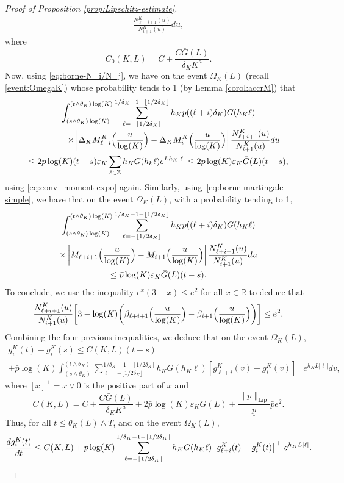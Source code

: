 \documentclass[10pt]{amsart}
\theoremstyle{plain}
\theoremstyle{remark}
\newcommand\Z{\mathbb{Z}}
\begin{document}
\begin{proof}[Proof of Proposition \ref{prop:Lipschitz-estimate}]
{\begin{align*}
\frac{N^K_{\ell+i+1}(u)}{N^K_{i+1}(u)}du,
\end{align*}
where \[C_0(K,L) = C+\frac{C\bar G(L)}{\delta_K K^a}.\] Now, using \eqref{eq:borne-N_i/N_j}, we have on the event $\Omega_K(L)$ (recall \eqref{event:OmegaK}) whose probability tends to 1 (by Lemma \ref{corol:accrM}) that
\begin{multline*}
\int_{(s\wedge\theta_K)\log(K)}^{(t\wedge\theta_K)\log(K)} \sum_{\ell=-\lfloor 1/2\delta_K\rfloor}^{1/\delta_K-1-\lfloor 1/2\delta_K\rfloor}
h_{K} p((\ell+i)\delta_K)G(h_{K}\ell)\\[-3pt]
\shoveright{\times\left|\Delta_KM^K_{\ell+i}\Bigl(\frac{u}{\log(K)}\Bigr)-\Delta_KM^K_{i}\Bigl(\frac{u}{\log(K)}\Bigr)\right|
\frac{N^K_{\ell+i+1}(u)}{N^K_{i+1}(u)}du} \\
\leq 2\bar p \log(K) (t-s)\varepsilon_K\sum_{\ell\in\Z} h_K G(h_k\ell)e^{L h_K|\ell|}\leq 2\bar{p}\log(K) \varepsilon_K \bar G(L)(t-s),
\end{multline*}
using \eqref{eq:conv_moment-expo} again.
Similarly, using~\eqref{eq:borne-martingale-simple}, we have that on the event $\Omega_K(L)$, with a probability tending to 1,
\begin{multline*}
\int_{(s\wedge\theta_K)\log(K)}^{(t\wedge\theta_K)\log(K)} \sum_{\ell=-\lfloor 1/2\delta_K\rfloor}^{1/\delta_K-1-\lfloor 1/2\delta_K\rfloor}
h_{K} p((\ell+i)\delta_K)G(h_{K}\ell)\\
\times \left|M_{\ell+i+1}\Bigl(\frac{u}{\log(K)}\Bigr)-M_{i+1}\Bigl(\frac{u}{\log(K)}\Bigr)\right|
\frac{N^K_{\ell+i+1}(u)}{N^K_{i+1}(u)}du\\
\leq \bar{p}\log(K) \varepsilon_K \bar G(L)(t-s).
\end{multline*}
To conclude, we use the inequality {$e^x(3-x)\leq e^2$} for all $x\in\mathbb{R}$ to deduce that
\[
\frac{N^K_{\ell+i+1}(u)}{N^K_{i+1}(u)}\biggl[{3}-\log(K)\biggl(\beta_{\ell+i+1}\Bigl(\frac{u}{\log(K)}\Bigr)-\beta_{i+1}\Bigl(\frac{u}{\log(K)}\Bigr)\biggr)\biggr]\leq {e^2}.
\]
Combining the four previous inequalities, we deduce that on the event $\Omega_K(L)$,
\begin{multline*}g^K_{i}(t)-g^K_{i}(s) \leq C(K,L)(t-s)\\
+
\bar p \log(K) \int_{(s\wedge\theta_K)}^{(t\wedge\theta_K)} \sum_{\ell=-\lfloor 1/2\delta_K\rfloor}^{1/\delta_K-1-\lfloor 1/2\delta_K\rfloor}
h_{K} G(h_{K}\ell) \left[g^K_{\ell+i}(v) - g^K_{i}(v)\right]^+ \, e^{h_{K}L|\ell|}dv,\end{multline*}
where $[x]^+=x\vee 0$ is the positive part of $x$ and
\[
C(K,L)=C+\frac{C\bar G(L)}{\delta_K K^
a} +2\bar{p}\log(K) \varepsilon_K \bar G(L)+ \frac{\|p\|_{\text{Lip}}}{\underline{p}}\bar{p}e^2.
\]
Thus, for all $t\leq\theta_K(L)\wedge T$, and on the event $\Omega_K(L)$,
\[
{d g^K_{i}(t)\over dt} \le C(K,L)
+ \bar p \log(K)\sum_{\ell=-\lfloor 1/2\delta_K\rfloor}^{1/\delta_K-1-\lfloor 1/2\delta_K\rfloor}
h_{K} G(h_{K}\ell) \left[g^K_{\ell+i}(t) - g^K_{i}(t)\right]^+ \, e^{h_{K}L|\ell|}.
\]

}
\end{proof}
\end{document}
